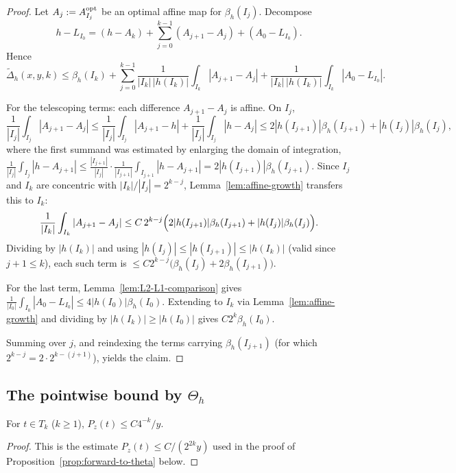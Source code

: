 \begin{proof}
	Let $A_j:=A_{I_j}^{\rm opt}$ be an optimal affine map for $\beta_h(I_j)$. Decompose
	\[
	h-L_{I_0}=(h-A_k)+\sum_{j=0}^{k-1}(A_{j+1}-A_j)+(A_0-L_{I_0}).
	\]
	Hence
	\[
	\widetilde\Delta_h(x,y,k)\le\beta_h(I_k)
	+\sum_{j=0}^{k-1}\frac{1}{|I_k|\,|h(I_k)|}\int_{I_k}|A_{j+1}-A_j|
	+\frac{1}{|I_k|\,|h(I_k)|}\int_{I_k}|A_0-L_{I_0}|.
	\]
	
	For the telescoping terms: each difference $A_{j+1}-A_j$ is affine. On $I_j$,
	\[
	\frac1{|I_j|}\int_{I_j}|A_{j+1}-A_j|
	\le\frac1{|I_j|}\int_{I_j}|A_{j+1}-h|+\frac1{|I_j|}\int_{I_j}|h-A_j|
	\le 2|h(I_{j+1})|\beta_h(I_{j+1})+|h(I_j)|\beta_h(I_j),
	\]
	where the first summand was estimated by enlarging the domain of integration,
	$\frac1{|I_j|}\int_{I_j}|h-A_{j+1}|
	\le\frac{|I_{j+1}|}{|I_j|}\cdot\frac1{|I_{j+1}|}\int_{I_{j+1}}|h-A_{j+1}|
	=2|h(I_{j+1})|\beta_h(I_{j+1})$. Since $I_j$ and $I_k$ are concentric with
	$|I_k|/|I_j|=2^{k-j}$, Lemma~\ref{lem:affine-growth} transfers this to $I_k$:
	\[
	\frac1{|I_k|}\int_{I_k}|A_{j+1}-A_j|
	\le C\,2^{k-j}\Bigl(2|h(I_{j+1})|\beta_h(I_{j+1})+|h(I_j)|\beta_h(I_j)\Bigr).
	\]
	Dividing by $|h(I_k)|$ and using $|h(I_j)|\le|h(I_{j+1})|\le|h(I_k)|$ (valid
	since $j+1\le k$), each such term is $\le C2^{k-j}\bigl(\beta_h(I_j)+2\beta_h(I_{j+1})\bigr)$.
	
	For the last term, Lemma~\ref{lem:L2-L1-comparison} gives
	$\frac1{|I_0|}\int_{I_0}|A_0-L_{I_0}|\le4|h(I_0)|\beta_h(I_0)$. Extending to $I_k$ via Lemma~\ref{lem:affine-growth} and dividing by $|h(I_k)|\ge|h(I_0)|$ gives $C 2^k\beta_h(I_0)$.
	
	Summing over $j$, and reindexing the terms carrying $\beta_h(I_{j+1})$ (for which
	$2^{k-j}=2\cdot2^{k-(j+1)}$), yields the claim.
\end{proof}

\subsection{\texorpdfstring{The pointwise bound by $\Theta_h$}{The pointwise bound by Theta_h}}

\begin{lemma}\label{lem:poisson_annulus_bound}
	\leanok
	For $t\in T_k$ ($k\ge1$), $P_z(t)\le C4^{-k}/y$.
\end{lemma}
\begin{proof}
	This is the estimate $P_z(t)\le C/(2^{2k}y)$ used in the proof of Proposition~\ref{prop:forward-to-theta} below.
\end{proof}

